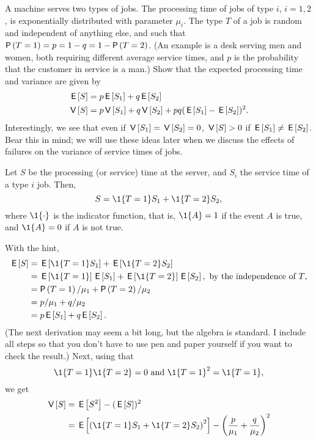 \begin{extra}
 A machine serves two types of jobs.
 The processing time of jobs of type $i$, $i=1,2$, is exponentially distributed with parameter $\mu_i$.
 The type $T$ of a job is random and independent of anything else, and such that $\P{T=1} = p = 1-q = 1-\P{T=2}$.
 (An example is a desk serving men and women, both requiring different average service times, and $p$ is the probability that the customer in service is a man.)
 Show that the expected processing time and variance are given by
\begin{align*}
 \,\mathsf{E}\left[S\right] &= p \,\mathsf{E}\left[S_1\right] + q \,\mathsf{E}\left[S_2\right] \\
\,\mathsf{V}\left[S\right] &= p \,\mathsf{V}\left[S_1\right] + q \,\mathsf{V}\left[S_2\right] + pq(\,\mathsf{E}\left[S_1\right] - \,\mathsf{E}\left[S_2\right])^2.
 \end{align*}
Interestingly, we see that even if $\,\mathsf{V}\left[S_1\right] = \,\mathsf{V}\left[S_2\right] = 0$, $\,\mathsf{V}\left[S\right] > 0$
if $\,\mathsf{E}\left[S_1\right] \neq \,\mathsf{E}\left[S_2\right]$. Bear this in mind; we will use these ideas
later when we discuss the effects of failures on the variance of
service times of jobs.
\begin{hint}
 Let $S$ be the processing (or service) time at the server, and
 $S_i$ the service time of a type $i$ job. Then, 
 \begin{equation*}
 S = \1{T=1} S_1 + \1{T=2} S_2,
 \end{equation*}
 where $\1{\cdot}$ is the indicator function, that is, $\1{A}=1$ if the
 event $A$ is true, and $\1{A}=0$ if $A$ is not true. 
\end{hint}
\begin{solution}
With the hint, 
\begin{align*}
 \E S 
&= \E{\1{T=1} S_1} + \E{\1{T=2} S_2} \\
&= \E{\1{T=1}} \E{ S_1} + \E{\1{T=2}} \E{S_2}, \text{ by the independence of $T$}, \\
&= \P{T=1} /\mu_1 + \P{T=2}/ \mu_2 \\
&= p /\mu_1 + q/ \mu_2 \\
&= p \E{S_1} + q \E{S_2}.
\end{align*}
(The next derivation may seem a bit long, but the algebra is
standard. I include all steps so that you don't have to use pen and
paper yourself if you want to check the result.) Next, using that
\begin{equation*}
\1{T=1}\1{T=2} = 0 \text{ and } \1{T=1}^2 = \1{T=1},
\end{equation*}
we get
\begin{align*}
 \V S 
&= \E{S^2} - (\E S)^2 \\
&= \E{\left(\1{T=1} S_1 + \1{T=2} S_2\right)^2} - \left(\frac{p}{\mu_1}+\frac{q}{\mu_2}\right)^2 \\

\end{align*}
\end{solution}
\end{extra}
